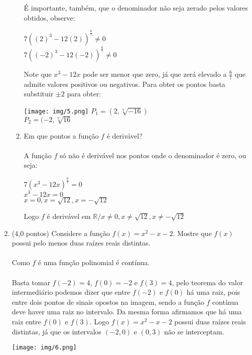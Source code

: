\documentclass[12pt]{article}
\begin{document}
\begin{enumerate}
\begin{enumerate}
		É importante, também, que o denominador não seja zerado pelos valores obtidos, observe:
		
		\begin{center}
			$ 7((2)^3 - 12(2))^{\frac{6}{7}} \not= 0 $\\
			$ 7((-2)^3 - 12(-2))^{\frac{6}{7}} \not= 0 $\\
		\end{center}
		
		Note que $x^3 - 12x$ pode ser menor que zero, já que zerá elevado a $\frac{6}{7}$ que admite valores positivos ou negativos. Para obter os pontos basta substituir $\pm 2$ para obter:
		
		\begin{center}
			\texttt{[image: img/5.png]}
			$ P_1=(2, \sqrt[7]{-16} ) $\\
			$ P_2=(-2, \sqrt[7]{16} $\\
		\end{center}		
		
		\item Em que pontos a função $f$ é derivável?\\
		\\
		A função $f$ só não é derivável nos pontos onde o denominador é zero, ou seja:
		
		\begin{center}
			$ 7(x^3 - 12x)^{\frac{6}{7}} = 0 $\\
			$ x^3 - 12x = 0 $\\
			$ x = 0, x = \sqrt{12}, x = -\sqrt{12}$\\
		\end{center}
		
		Logo $f$ é derivável em $\mathbb{R} / x \not= 0, x \not= \sqrt{12}, x \not= -\sqrt{12}$\\
	\end{enumerate}
	\item (4,0 pontos) Considere a função $ f(x) = x^2 - x -2 $. Mostre que $f(x)$ possui pelo menos duas raízes reais distintas.\\
	\\
	Como $f$ é uma função polinomial é contínua.\\
	\\
	Basta tomar $f(-2) = 4$, $f(0) = -2$ e $f(3) = 4$, pelo teorema do valor intermediário podemos dizer que entre  $f(-2)$ e $f(0)$ há uma raiz, pois entre dois pontos de sinais opostos na imagem, sendo a função $f$ contínua deve haver uma raiz no intervalo. Da mesma forma afirmamos que há uma raiz entre $f(0)$ e $f(3)$. Logo $ f(x) = x^2 - x -2 $ possui duas raízes reais distintas, já que os intervalos $(-2,0)$ e $(0,3)$ não se interceptam.
	
	\begin{center}
		\texttt{[image: img/6.png]}
	\end{center}	
\end{enumerate}
\end{document}
